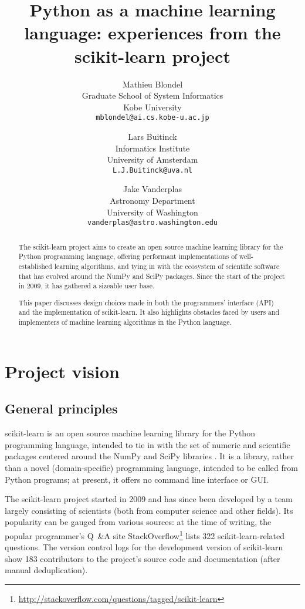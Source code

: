 \documentclass[a4paper]{article}
\title{Python as a machine learning language:
       experiences from the scikit-learn project}
\author{Mathieu Blondel \\
        Graduate School of System Informatics \\
        Kobe University \\
        \small{\texttt{mblondel@ai.cs.kobe-u.ac.jp}}
      \and
        Lars Buitinck \\
        Informatics Institute \\
        University of Amsterdam \\
        \small{\texttt{L.J.Buitinck@uva.nl}}
      \and
        Jake Vanderplas \\
        Astronomy Department \\
        University of Washington \\
        \small{\texttt{vanderplas@astro.washington.edu}}
}
\begin{document}
\maketitle

\begin{abstract}
The scikit-learn project aims to create an open source
machine learning library for the Python programming language,
offering performant implementations of well-established learning algorithms,
and tying in with the ecosystem of scientific software
that has evolved around the NumPy and SciPy packages.
Since the start of the project in 2009,
it has gathered a sizeable user base.

This paper discusses design choices made
in both the programmers' interface (API) and the implementation
of scikit-learn.
It also highlights obstacles faced by users and implementers
of machine learning algorithms in the Python language.
\end{abstract}

\section{Project vision}

\subsection{General principles}

scikit-learn \citep{pedregosa2011} is an open source machine learning library
for the Python programming language,
intended to tie in with the set of numeric and scientific packages
centered around the NumPy and SciPy libraries
.
It is a library, rather than a novel (domain-specific) programming language,
intended to be called from Python programs;
at present, it offers no command line interface or GUI.

The scikit-learn project started in 2009 and has since been developed
by a team largely consisting of scientists
(both from computer science and other fields).
Its popularity can be gauged from various sources:
at the time of writing,
the popular programmer's Q~\&{}A site StackOverflow\footnote{
  \url{http://stackoverflow.com/questions/tagged/scikit-learn}}
lists 322 scikit-learn-related questions.
The version control logs for the development version of scikit-learn
show 183 contributors to the project's source code and documentation
(after manual deduplication).
\end{document}
